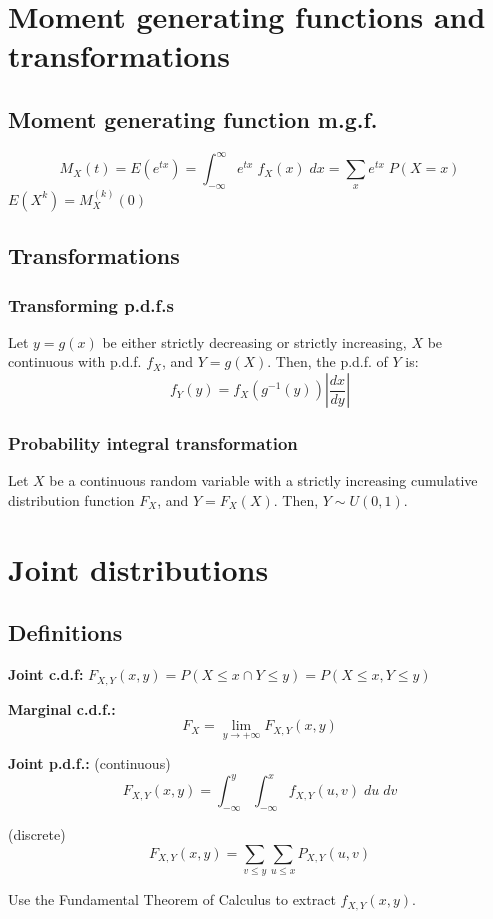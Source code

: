 \documentclass[15pt]{article}
\begin{document}
\section{Moment generating functions and transformations}
\subsection{Moment generating function m.g.f.}
\[
    M_X (t) = E(e^{tx}) = \int_{-\infty}^{\infty}  e^{tx} \; f_X (x) \; dx = \sum_x e^{tx} \; P(X = x)
\]
$E(X^k) = M_X^{(k)} (0)$

\subsection{Transformations}
\subsubsection{Transforming p.d.f.s}
Let $y = g(x)$ be either strictly decreasing or strictly increasing, $X$ be continuous with p.d.f. $f_X$, and $Y = g(X)$. Then, the p.d.f. of $Y$ is:
\[
    f_Y (y) = f_X (g^{-1} (y)) \left|\frac{dx}{dy}\right|
\]

\subsubsection{Probability integral transformation}
Let $X$ be a continuous random variable with a strictly increasing cumulative distribution function $F_X$, and $Y = F_X (X)$. Then, $Y \sim U(0,1)$.

\section{Joint distributions}
\subsection{Definitions}
\textbf{Joint c.d.f:} $F_{X,Y} (x,y) = P(X \leq x \cap Y \leq y) = P(X \leq x, Y \leq y)$

\textbf{Marginal c.d.f.:} 
\[
	F_X = \lim_{y \to + \infty} F_{X,Y} (x,y)
\]

\textbf{Joint p.d.f.:} (continuous)
\[
    F_{X,Y} (x,y) = \int_{-\infty}^y \int_{-\infty}^x f_{X,Y} (u,v) \; du \; dv
\]

(discrete)
\[
    F_{X,Y} (x,y) = \sum_{v \leq y} \sum_{u \leq x} P_{X,Y} (u,v)
\]

Use the Fundamental Theorem of Calculus to extract $f_{X,Y} (x,y)$.
\end{document}
